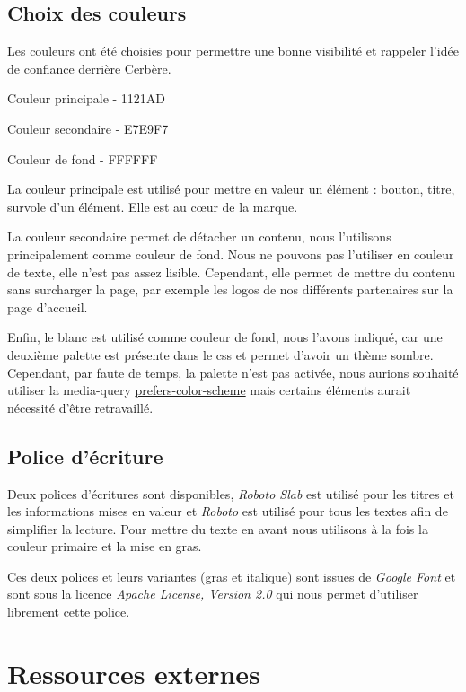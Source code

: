 \documentclass{article}
\begin{document}
\subsection{Choix des couleurs}
Les couleurs ont été choisies pour permettre une bonne visibilité et rappeler l'idée de confiance derrière Cerbère.
\bigskip

\quad Couleur principale - 1121AD

\quad Couleur secondaire - E7E9F7

\quad Couleur de fond - FFFFFF
\bigskip

La couleur principale est utilisé pour mettre en valeur un élément : bouton, titre, survole d'un élément. Elle est au cœur de la marque.

La couleur secondaire permet de détacher un contenu, nous l'utilisons principalement comme couleur de fond. Nous ne pouvons pas l'utiliser en couleur de texte, elle n'est pas assez lisible. Cependant, elle permet de mettre du contenu sans surcharger la page, par exemple les logos de nos différents partenaires sur la page d'accueil.

Enfin, le blanc est utilisé comme couleur de fond, nous l'avons indiqué, car une deuxième palette est présente dans le css et permet d'avoir un thème sombre. Cependant, par faute de temps, la palette n'est pas activée, nous aurions souhaité utiliser la media-query \href{https://developer.mozilla.org/en-US/docs/Web/CSS/@media/prefers-color-scheme}{prefers-color-scheme} mais certains éléments aurait nécessité d'être retravaillé.

\subsection{Police d'écriture}
Deux polices d'écritures sont disponibles, \textit{Roboto Slab} est utilisé pour les titres et les informations mises en valeur et \textit{Roboto} est utilisé pour tous les textes afin de simplifier la lecture. Pour mettre du texte en avant nous utilisons à la fois la couleur primaire et la mise en gras.

Ces deux polices et leurs variantes (gras et italique) sont issues de \textit{Google Font} et sont sous la licence \textit{Apache License, Version 2.0} qui nous permet d'utiliser librement cette police.

\section{Ressources externes}
\end{document}
